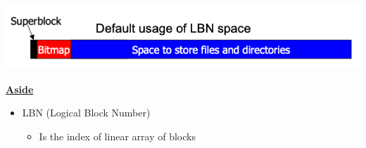 \documentclass[12pt]{article}
\begin{document}
\begin{itemize}
\begin{itemize}
        \begin{center}
            \includegraphics[width=0.8\linewidth]{images/week_9_notes_1_9.png}
        \end{center}
    \end{itemize}

    \pagebreak

    \begin{mdframed}
        \underline{\textbf{Aside}}

        \bigskip

        \begin{itemize}
            \item LBN (Logical Block Number)
            \begin{itemize}
                \item Is the index of linear array of blocks
            \end{itemize}


\end{itemize}
\end{mdframed}
\end{itemize}
\end{document}
